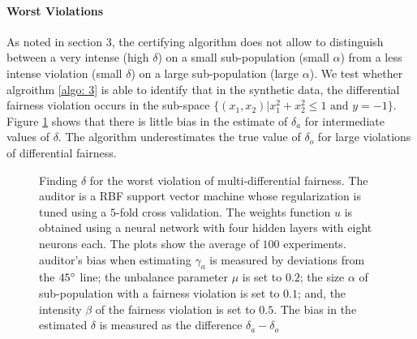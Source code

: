 \documentclass{article}
\begin{document}
\paragraph{Worst Violations}
As noted in section 3, the certifying algorithm does not allow to distinguish between a very intense (high $\delta$)
on a small sub-population (small $\alpha$) from a less intense violation (small $\delta$) on a large sub-population (large $\alpha$). We test whether algroithm \ref{algo: 3} is able to identify that in the synthetic data, the differential fairness violation occurs in the sub-space $\{(x_{1}, x_{2})|x^{2}_{1} + x^{2}_{2} \leq 1 \mbox{ and } y=-1\}$. Figure \ref{fig: 3a} shows that there is little bias in the estimate of $\delta_{a}$ for intermediate values of $\delta$. The algorithm underestimates the true value of $\delta_{o}$ for large violations of differential fairness. 
\begin{figure}[h!]
	\begin{subfigure} {.475\linewidth}
		\centering
	\end{subfigure}
	\label{fig: 3a}
	\caption{Finding $\delta$ for the worst violation of multi-differential fairness. The auditor is a RBF support vector machine whose regularization is tuned using a $5$-fold cross validation.  The weights function $u$ is obtained using a neural network with four hidden layers with eight neurons each. The plots show the average of $100$ experiments. auditor's bias when estimating $\gamma_{a}$ is measured by deviations from the $45\degree$ line; the unbalance parameter $\mu$ is set to $0.2$; the size $\alpha$ of sub-population with a fairness violation is set to $0.1$; and, the intensity $\beta$ of the fairness violation is set to $0.5$.  The bias in the estimated $\delta$ is measured as the difference $\delta_{a}-\delta_{o}$  }  
\end{figure}
\end{document}
